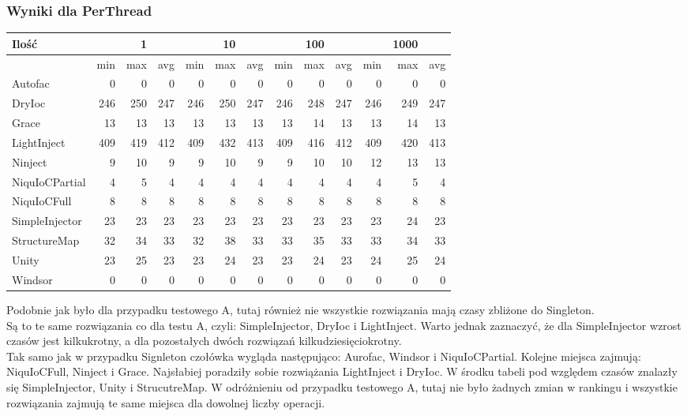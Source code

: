 \documentclass[12pt]{article}
\begin{document}
\subsubsection{Wyniki dla PerThread}
\begin{center}
\begin{small}
	\begin{tabular}{ | l | r r r | r r r | r r r | r r r | }
    		\hline
Ilość & & 1 & & & 10 & & & 100 & & & 1000 & \\ \hline
 & min & max & avg & min & max & avg & min & max & avg & min & max & avg \\ \hline
Autofac & 0 & 0 & 0 & 0 & 0 & 0 & 0 & 0 & 0 & 0 & 0 & 0 \\ \hline
DryIoc & 246 & 250 & 247 & 246 & 250 & 247 & 246 & 248 & 247 & 246 & 249 & 247 \\ \hline
Grace & 13 & 13 & 13 & 13 & 13 & 13 & 13 & 14 & 13 & 13 & 14 & 13 \\ \hline
LightInject & 409 & 419 & 412 & 409 & 432 & 413 & 409 & 416 & 412 & 409 & 420 & 413 \\ \hline
Ninject & 9 & 10 & 9 & 9 & 10 & 9 & 9 & 10 & 10 & 12 & 13 & 13 \\ \hline
NiquIoCPartial & 4 & 5 & 4 & 4 & 4 & 4 & 4 & 4 & 4 & 4 & 5 & 4 \\ \hline
NiquIoCFull & 8 & 8 & 8 & 8 & 8 & 8 & 8 & 8 & 8 & 8 & 8 & 8 \\ \hline
SimpleInjector & 23 & 23 & 23 & 23 & 23 & 23 & 23 & 23 & 23 & 23 & 24 & 23 \\ \hline
StructureMap & 32 & 34 & 33 & 32 & 38 & 33 & 33 & 35 & 33 & 33 & 34 & 33 \\ \hline
Unity & 23 & 25 & 23 & 23 & 24 & 23 & 23 & 24 & 23 & 24 & 25 & 24 \\ \hline
Windsor & 0 & 0 & 0 & 0 & 0 & 0 & 0 & 0 & 0 & 0 & 0 & 0 \\ \hline
  	\end{tabular}
\end{small}
\end{center}
Podobnie jak było dla przypadku testowego A, tutaj również nie wszystkie rozwiązania mają czasy zbliżone do Singleton.\\
Są to te same rozwiązania co dla testu A, czyli: SimpleInjector, DryIoc i LightInject. Warto jednak zaznaczyć, że dla SimpleInjector wzrost czasów jest kilkukrotny, a dla pozostałych dwóch rozwiązań kilkudziesięciokrotny.\\
Tak samo jak w przypadku Signleton czołówka wygląda następująco: Aurofac, Windsor i NiquIoCPartial. Kolejne miejsca zajmują: NiquIoCFull, Ninject i Grace. Najsłabiej poradziły sobie rozwiążania LightInject i DryIoc. W środku tabeli pod względem czasów znalazły się SimpleInjector, Unity i StrucutreMap. W odróżnieniu od przypadku testowego A, tutaj nie było żadnych zmian w rankingu i wszystkie rozwiązania zajmują te same miejsca dla dowolnej liczby operacji.
\end{document}
